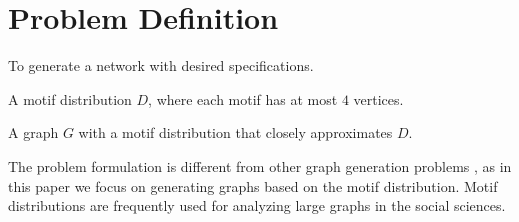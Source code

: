 \section{Problem Definition}
\label{sec:problem}
 To generate a network with desired specifications.

 A motif distribution $D$, where each motif has at most $4$ vertices.

 A graph $G$ with a motif distribution that closely approximates $D$.

The problem formulation is different from other graph generation problems
\cite{erdds1959random, watts1998collective, albert2002statistical,
newman2009random, molloy1995critical}, as in this paper we focus on
generating graphs based on the motif distribution.
Motif distributions are frequently used for analyzing large graphs in the
social sciences.
